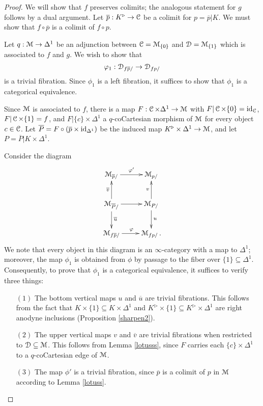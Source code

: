 \begin{proof}
We will show that $f$ preserves colimits; the analogous statement for $g$ follows by a dual argument. Let $\overline{p}: K^{\triangleright} \rightarrow \operatorname{\mathcal{C}}$ be a colimit for
$p = \overline{p}|K$. We must show that $f \circ \overline{p}$ is a colimit of
$f \circ p$.

Let $q: \operatorname{\mathcal{M}} \rightarrow \Delta^1$ be an adjunction between $\operatorname{\mathcal{C}} = \operatorname{\mathcal{M}}_{\{0\}}$ and $\operatorname{\mathcal{D}} = \operatorname{\mathcal{M}}_{ \{1\} }$ which is associated to $f$ and $g$.  We wish to show that
$$\varphi_1: \operatorname{\mathcal{D}}_{f \overline{p}/} \rightarrow \operatorname{\mathcal{D}}_{f p/}$$
is a trivial fibration. Since $\phi_1$ is a left fibration, it suffices to show that
$\phi_1$ is a categorical equivalence.

Since $\operatorname{\mathcal{M}}$ is associated to $f$, there is a map
$F: \operatorname{\mathcal{C}} \times \Delta^1 \rightarrow \operatorname{\mathcal{M}}$ with $F| \operatorname{\mathcal{C}} \times \{0\} = \operatorname{id}_{\operatorname{\mathcal{C}}}$, 
$F| \operatorname{\mathcal{C}} \times \{1\} = f$, and $F| \{c\} \times \Delta^1$ a $q$-coCartesian morphism of $\operatorname{\mathcal{M}}$
for every object $c \in \operatorname{\mathcal{C}}$. 
Let $\overline{P} = F \circ (\overline{p} \times \operatorname{id}_{\Delta^1})$
be the induced map $K^{\triangleright} \times \Delta^1 \rightarrow \operatorname{\mathcal{M}}$, and let
$P = \overline{P}|K \times \Delta^1$.

Consider the diagram
$$\xymatrix{ \calM_{\overline{p}/} \ar[r]^{\phi'} & \calM_{p/} \\
\calM_{\overline{P}/} \ar[r] \ar[u]^{\overline{v}} \ar[d]^{\overline{u}} & \calM_{P/} \ar[u]^{v} \ar[d]^{u}\\
\calM_{f \overline{p}/} \ar[r]^{\phi} & \calM_{f p/}. }$$
We note that every object in this diagram is an $\infty$-category with a map to $\Delta^1$; moreover, the map $\phi_{1}$ is obtained from $\phi$ by passage to the fiber over $\{1\} \subseteq \Delta^1$. Consequently, to prove that $\phi_1$ is a categorical equivalence, it suffices to verify three things:

\begin{itemize}
\item[$(1)$] The bottom vertical maps $u$ and $\overline{u}$ are trivial fibrations.
This follows from the fact that $K \times \{1\} \subseteq K \times \Delta^1$ and
$K^{\triangleright} \times \{ 1\} \subseteq K^{\triangleright} \times \Delta^1$ are right anodyne inclusions (Proposition \ref{sharpen2}).

\item[$(2)$] The upper vertical maps $v$ and $\overline{v}$ are trivial fibrations when restricted to
$\operatorname{\mathcal{D}} \subseteq \operatorname{\mathcal{M}}$. This follows from Lemma \ref{lotusss}, since $F$ carries
each $\{c\} \times \Delta^1$ to a $q$-coCartesian edge of $\operatorname{\mathcal{M}}$.

\item[$(3)$] The map $\phi'$ is a trivial fibration, since $\overline{p}$ is a colimit of
$p$ in $\operatorname{\mathcal{M}}$ according to Lemma \ref{lotuss}.

\end{itemize}

\end{proof}

